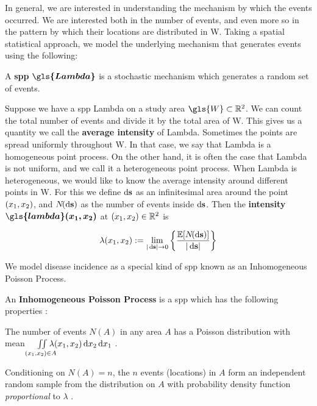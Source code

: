 In general, we are interested in understanding the mechanism by which the events occurred.
We are interested both in the number of events, and even more so in the pattern by which their locations are distributed in \gls{W}.
Taking a spatial statistical approach, we model the underlying mechanism that generates events using the following:

\begin{defn}
    \label{defn:spp}
    A \textbf{\gls{spp}} $\boldsymbol{\gls{Lambda}}$ is a stochastic mechanism which generates a random set of events.
\end{defn}

Suppose we have a \gls{spp} \gls{Lambda} on a study area $\gls{W} \subset \RS$.
We can count the total number of \glspl{event} and divide it by the total area of \gls{W}.
This gives us a quantity we call the \textbf{average \gls{intensity}} of \gls{Lambda}.
Sometimes the points are spread uniformly throughout \gls{W}.
In that case, we say that \gls{Lambda} is a homogeneous point process.
On the other hand, it is often the case that \gls{Lambda} is not uniform,
and we call it a heterogeneous point process.
When \gls{Lambda} is heterogeneous,
we would like to know the average \gls{intensity} around different points in \gls{W}.
For this
we define $\mathop{}\!\mathrm{d}{\mathbf{s}}$ as an infinitesimal area around the point $(x_1, x_2)$,
and $N\!(\mathop{}\!\mathrm{d}{\mathbf{s}})$ as the number of \glspl{event} inside $\mathop{}\!\mathrm{d}{\mathbf{s}}$.
Then the \textbf{\gls{intensity}} $\boldsymbol{\gls{lambda}\xvec}$ at $(x_1, x_2) \in \mathbb{R}^2$ is

\begin{equation}
    \label{eq:lambda_differential}
    \lambda \xvec := \lim_{|\ds| \to 0}
        \left\{
            \frac{\mathbb{E}[N\!(\ds)]}%
            {|\ds|}
        \right\}
\end{equation}

We model disease incidence as a special kind of \gls{spp} known as an Inhomogeneous Poisson Process.
\begin{defn}
    \label{defn:inhomogenouspoissonprocess}
    An \textbf{Inhomogeneous Poisson Process} is a \gls{spp} which has the following properties \citep[Section 4.4]{diggle1983spatial}:
    \begin{properties}
        \item The number of events $N\!(A)$ in any area $A$ has a Poisson distribution with mean
            $\iint\limits_{(x_1, x_2) \in A}{\hspace{-1em} \lambda (x_1, x_2) \mathop{}\!\mathrm{d}{x_2} \mathop{}\!\mathrm{d}{x_1}}$
            \label{defn:inhomogenouspoissonprocess:1}.
        \item Conditioning on $N\!(A) \! = \! n$,
            the $n$ events (locations) in $A$ form an independent random sample from the distribution on $A$ with probability density function \textit{proportional} to $\lambda$ \label{defn:inhomogenouspoissonprocess:2}.
    \end{properties}
\end{defn}

